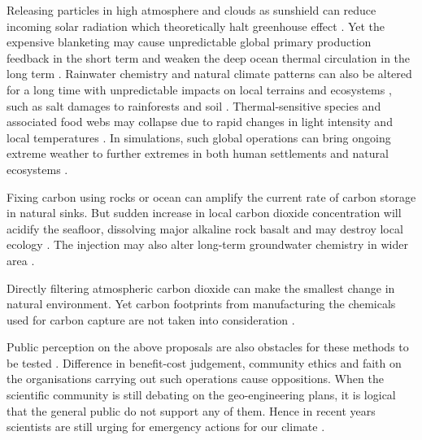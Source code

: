 \documentclass[../thesis.tex]{subfiles} %
\begin{document}
Releasing particles in high atmosphere and clouds as sunshield \autocite{latham2008global,stjern2018response,xia2016stratospheric} can reduce incoming solar radiation which theoretically halt greenhouse effect \autocite{williamson2012impacts}.  Yet the expensive blanketing \autocite{boyd2008implications} may cause unpredictable global primary production feedback in the short term and weaken the deep ocean thermal circulation in the long term \autocite{lauvset2017climate,williamson2012impacts}.  Rainwater chemistry and natural climate patterns can also be altered for a long time with unpredictable impacts on local terrains and ecosystems \autocite{bala2011albedo}, such as salt damages to rainforests and soil \autocite{muri2015tropical}.  Thermal-sensitive species and associated food webs may collapse due to rapid changes in light intensity and local temperatures \autocite{williamson2012impacts}.  In simulations, such global operations can bring ongoing extreme weather to further extremes in both human settlements and natural ecosystems \autocite{jones2009climate}.

Fixing carbon using rocks \autocite{stephens2008assessing,gunnarsson2018rapid} or ocean \autocite{salter200920,sant2014offshore} can amplify the current rate of carbon storage in natural sinks.  But sudden increase in local carbon dioxide concentration will acidify the seafloor, dissolving major alkaline rock basalt and may destroy local ecology \autocite{trias2017high,ridgwell2011geographical}.  The injection may also alter long-term groundwater chemistry in wider area \autocite{trias2017high}.

Directly filtering atmospheric carbon dioxide \autocite{broecker2007co2,williamson2016emissions} can make the smallest change in natural environment.  Yet carbon footprints from manufacturing the chemicals used for carbon capture are not taken into consideration \autocite{stephens2008assessing}.

Public perception on the above proposals are also obstacles for these methods to be tested \autocite{kamishiro2009public}.  Difference in benefit-cost judgement, community ethics and faith on the organisations carrying out such operations cause oppositions.  When the scientific community is still debating on the geo-engineering plans, it is logical that the general public do not support any of them.  Hence in recent years scientists are still urging for emergency actions for our climate \autocite{lenton2019foresight,van2017open}.
\end{document}
